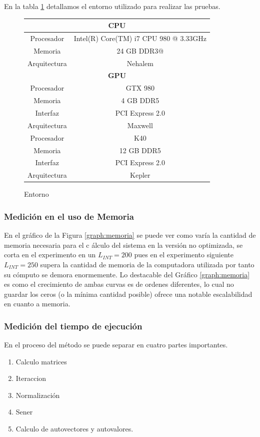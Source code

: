 \documentclass[a4paper,openright,12pt, oneside]{book}
\begin{document}
En la tabla \ref{table:env} detallamos el entorno utilizado para realizar las pruebas. 



\begin{figure}[h]
\begin{center}
\label{table:env}
\small
\begin{tabular}{ |c|c| }
  \hline
  \multicolumn{2}{|c|}{\textbf{CPU}} \\
  \hline

  Procesador & Intel(R) Core(TM) i7 CPU 980 @ 3.33GHz \\
  \hline
  Memoria & 24 GB DDR3@  \\
  \hline
  Arquitectura & Nehalem \\
  \hline
  \multicolumn{2}{|c|}{\textbf{GPU}} \\
  \hline
  Procesador &GTX 980 \\
  \hline
  Memoria & 4 GB DDR5 \\
  \hline
  Interfaz & PCI Express 2.0 \\
  \hline
  Arquitectura & Maxwell \\
  \hline
  Procesador & K40 \\
  \hline
  Memoria & 12 GB DDR5 \\
  \hline
  Interfaz & PCI Express 2.0 \\
  \hline
  Arquitectura & Kepler \\
  \hline

\end{tabular}
\end{center}
\caption{Entorno}
\end{figure}

\subsubsection{Medici\'on en el uso de Memoria}
En el gr\'afico de la Figura \ref{graph:memoria} se puede ver como var\'ia la cantidad de memoria necesaria para el c
\'alculo del sistema en la versi\'on no optimizada, se corta en el experimento en un $L_{INT}=200$ pues en el 
experimento siguiente $L_{INT}=250$ supera la cantidad de memoria de la computadora utilizada por tanto su c\'omputo 
se demora enormemente.
Lo destacable del Gr\'afico \ref{graph:memoria} es como el crecimiento de ambas curvas es de ordenes diferentes, lo 
cual no guardar los ceros (o la m\'inima cantidad posible) ofrece una notable escalabilidad en cuanto a memoria.

\subsubsection{Medici\'on del tiempo de ejecuci\'on}
En el proceso del m\'etodo se puede separar en cuatro partes importantes.
\begin{enumerate}
    \item Calculo matrices
    \item Iteraccion
    \item Normalizaci\'on
    \item Sener
    \item Calculo de autovectores y autovalores.
\end{enumerate}
\end{document}
